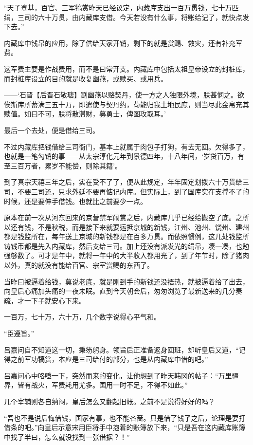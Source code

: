“天子登基，百官、三军犒赏昨天已经议定，内藏库支出一百万贯钱，七十万匹绢，三司的六十万贯，由内藏库支借。今天若没有什么事，将账给记了，就快点发下去。”

内藏库中钱帛的应用，除了供给天家开销，剩下的就是赏赐、救灾，还有补充军费。

这军费主要是作战费用，而不是曰常开支。内藏库中包括太祖皇帝设立的封桩库，而封桩库设立的目的就是收复幽燕，或赎买、或用兵。

——‘石晋【后晋石敬瑭】割幽燕以赂契丹，使一方之人独限外境，朕甚悯之。欲俟斯库所蓄满三五十万，即遣使与契丹约，苟能归我土地民庶，则当尽此金帛充其赎值。如曰不可，朕将散滞财，募勇士，俾图攻取耳。’

最后一个去处，便是借给三司。

不过内藏库把钱借给三司衙门，基本上就属于肉包子打狗，有去无回。欠得多了，也就是一笔勾销的事——从太宗淳化元年到景德四年，十八年间，‘岁贷百万，有至三百万者，累岁不能偿，则除其籍’。

到了真宗天禧三年之后，实在受不了了，便从此规定，年年固定划拨六十万贯给三司，不要三司还，只求外廷不要再惦记内库。但实际上，到了国库实在支撑不了的时候，还是要伸手借钱。也就比之前要少一点。

原本在前一次从河东回来的京营禁军闹赏之后，内藏库几乎已经给搬空了底。之所以还有钱，不是秋税，而是接下来就要运抵京城的新钱，江州、池州、饶州、建州都是钱监所在，每年送上京城的新钱都是在百多万贯。而依照惯例，这几处钱监所铸钱币都是先入内藏库，然后支给三司。加上还没有派发光的绢帛，凑一凑，也勉强够数了。可才是年中，就将一年中的大半收入都用光了，到了年节时，除了猪肉以外，真的就没有能给百官、宗室赏赐的东西了。

当昨曰被逼着给钱，莫说老底，就是刚到手的新钱还没捂热，就被逼着给了出去，向皇后心痛加头痛的一夜未眠。直到今天朝会后，匆匆浏览了最新送来的几分奏疏，才一下子就安心下来。

一百万，七十万，六十万，几个数字说得心平气和。

“臣遵旨。”

吕嘉问自不知道这一切，秉笏躬身。领旨后正准备返身回班，却听皇后又道，“记得之前军功犒赏，本应是三司给付的部分，也是从内藏库中借的吧。”

吕嘉问心中咯噔一下，突然而来的变化，让他想到了昨天韩冈的帖子：“万里疆界，皆有战火，军费耗用尤多。国用一时不足，不得不如此。”

几个宰辅则各自纳闷，皇后怎么又翻起旧帐。之前不是说得好好的吗？

“吾也不是说后悔借钱，国家有事，也不能吝啬。只是借了钱了之后，论理是要打借条的吧。”向皇后示意宋用臣将手中抱着的账簿放下来，“只是吾在这内藏库账簿中找了半曰，怎么就没找到一张借据？！”

